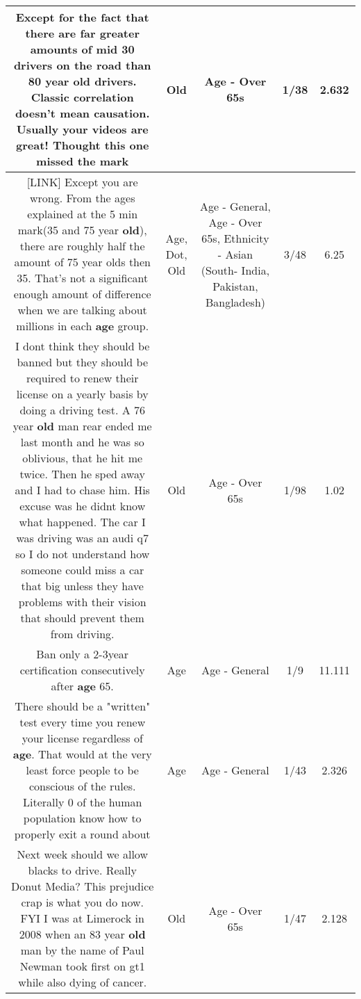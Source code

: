 \documentclass[11pt]{article}
\newlength\mylength
\begin{document}
\begin{center}
\begin{longtable}{|C{.65\mylength}|C{.30\mylength}|C{.12\mylength}|C{.12\mylength}|C{.12\mylength}|}
  \small Except for the fact that there are far greater amounts of mid 30 drivers on the road than 80 year \textbf{old} drivers. Classic correlation doesn't mean causation. Usually your videos are great! Thought this one missed the mark\normalsize   & Old & Age - Over 65s & 1/38 & 2.632 \\  \hline
  \small  [LINK]  Except you are wrong. From the ages explained at the 5 min mark(35 and 75 year \textbf{old}), there are roughly half the amount of 75 year olds then 35. That's not a significant enough amount of difference when we are talking about millions in each \textbf{age} group.\normalsize   & Age, Dot, Old & Age - General, Age - Over 65s, Ethnicity - Asian (South- India, Pakistan, Bangladesh) & 3/48 & 6.25 \\  \hline
  \small I dont think they should be banned but they should be required to renew their license on a yearly basis by doing a driving test. A 76 year \textbf{old} man rear ended me last month and he was so oblivious, that he hit me twice. Then he sped away and I had to chase him. His excuse was he didnt know what happened. The car I was driving was an audi q7 so I do not understand how someone could miss a car that big unless they have problems with their vision that should prevent them from driving.\normalsize   & Old & Age - Over 65s & 1/98 & 1.02 \\  \hline
  \small Ban only a 2-3year certification consecutively after \textbf{age} 65.\normalsize   & Age & Age - General & 1/9 & 11.111 \\  \hline
  \small There should be a "written" test every time you renew your license regardless of \textbf{age}. That would at the very least force people to be conscious of the rules. Literally 0 of the human population know how to properly exit a round about\normalsize   & Age & Age - General & 1/43 & 2.326 \\  \hline
  \small Next week should we allow blacks to drive.  Really Donut Media?  This prejudice crap is what you do now.  FYI I was at Limerock in 2008 when an 83 year \textbf{old} man by the name of Paul Newman took first on gt1 while also dying of cancer.\normalsize   & Old & Age - Over 65s & 1/47 & 2.128 \\  \hline

\end{longtable}
\end{center}
\end{document}
